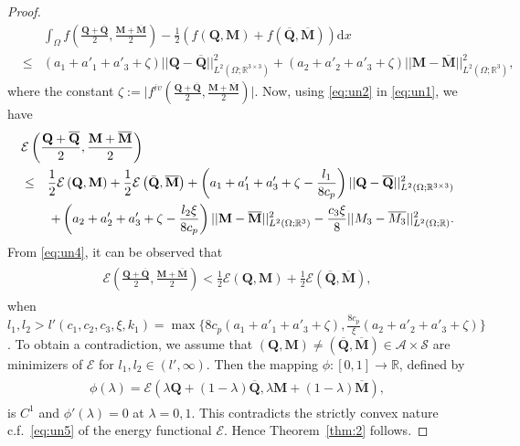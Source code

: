 \documentclass[10pt,a4paper]{amsart}
\def \Mvec{\mathbf{M}}
\def\Qvec{\mathbf{Q}}
\def\d{\mathrm{d}}
\begin{document}
\begin{proof}
\begin{eqnarray}\label{eq:un2}
& &\int_{\Omega}f\left(\frac{\Qvec+\overline{\Qvec}}{2}, \frac{\Mvec+\overline{\Mvec}}{2}\right)-\frac{1}{2}\left(f\left(\Qvec, \Mvec\right) + f\left(\overline{\Qvec}, \overline{\Mvec}\right)\right)\d x\nonumber\\
&\le& \left(a_1+a'_1+a'_3+\zeta\right)||\Qvec-\overline{\Qvec}||^2_{L^2\left(\Omega; \mathbb R^{3\times 3}\right)} + \left(a_2+a'_2+a'_3+\zeta\right)||\Mvec-\overline{\Mvec}||^2_{L^2\left(\Omega;\mathbb R^3\right)},
\end{eqnarray}
where the constant $\zeta := \bigg|f^{iv}\left(\frac{\Qvec+\overline{\Qvec}}{2}, \frac{\Mvec+\overline{\Mvec}}{2}\right)\bigg|$. 
Now, using \eqref{eq:un2} in \eqref{eq:un1}, we have
\begin{eqnarray}\label{eq:un4}
\lefteqn{\mathcal{E}\left(\frac{\Qvec+\overline{\Qvec}}{2}, \frac{\Mvec+\overline{\Mvec}}{2}\right)}\nonumber\\
&\le&\frac{1}{2}\mathcal{E}\left(\Qvec, \Mvec\right) + \frac{1}{2}\mathcal{E}\left(\bar{\Qvec}, \overline{\Mvec}\right)+\left(a_1+a'_1+a'_3+\zeta-\frac{l_1}{8c_p}\right)||\Qvec-\overline{\Qvec}||^2_{L^2\left(\Omega; \mathbb R^{3\times 3}\right)}\nonumber\\
&&+ \left(a_2+a'_2+a'_3+\zeta-\frac{l_2\xi}{8c_p}\right)||\Mvec-\overline{\Mvec}||^2_{L^2\left(\Omega; \mathbb R^3\right)} - \frac{c_3\xi}{8}||M_3-\overline{M_3}||^2_{L^2\left(\Omega; \mathbb R\right)}.
\end{eqnarray}
From \eqref{eq:un4}, it can be observed that
\begin{eqnarray}\label{eq:un5}
\begin{aligned}
\mathcal{E}\left(\frac{\Qvec+\overline{\Qvec}}{2}, \frac{\Mvec+\overline{\Mvec}}{2}\right)<\frac{1}{2}\mathcal{E}\left(\Qvec, \Mvec\right) + \frac{1}{2}\mathcal{E}\left(\overline{\Qvec}, \overline{\Mvec}\right),
\end{aligned}
\end{eqnarray}
when $l_1, l_2>l'\left(c_1, c_2, c_3, \xi, k_1\right)=\max \Big\{8c_p\left(a_1+a'_1+a'_3+\zeta\right), \frac{8c_p}{\xi}\left(a_2+a'_2+a'_3+\zeta\right)\Big\}$.\newline
To obtain a contradiction, we assume that $\left(\Qvec, \Mvec\right)\ne \left(\overline{\Qvec}, \overline{\Mvec}\right)\in\mathcal{A}\times\mathcal{S}$ are minimizers of $\mathcal{E}$ for $l_1,l_2\in\left(l', \infty\right)$. Then the mapping $\phi:[0,1]\rightarrow\mathbb R$, defined by
\begin{eqnarray}
\begin{aligned}
\phi\left(\lambda\right)=\mathcal{E}\left(\lambda\Qvec+\left(1-\lambda\right)\overline{\Qvec}, \lambda\Mvec + \left(1-\lambda\right)\overline{\Mvec}\right),
\end{aligned}
\end{eqnarray}
is $C^1$ and $\phi'\left(\lambda\right)=0$ at $\lambda=0,1$. This contradicts the strictly convex nature c.f.\ \eqref{eq:un5} of the energy functional $\mathcal{E}$. Hence Theorem~\ref{thm:2} follows.
\end{proof}
\end{document}
